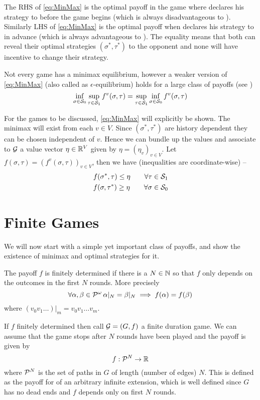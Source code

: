 The RHS of \eqref{eq:MinMax} is the optimal payoff in the game where  declares his strategy to  before the game begins (which is always disadvantageous to ). Similarly LHS of \eqref{eq:MinMax} is the optimal payoff when  declares his strategy to  in advance (which is always advantageous to ). The equality means that both can reveal their optimal strategies $(\sigma^*,\tau^*)$ to the opponent and none will have incentive to change their strategy.

Not every game has a minimax equilibrium, however a weaker version of \eqref{eq:MinMax} (also called as $\epsilon$-equilibrium) holds for a large class of payoffs (see  \cite{roux_equilibria})
\[
    \inf_{\sigma \in \ST{0}} \sup_{\tau \in \ST{1}} f^v(\sigma, \tau) = \sup_{\tau \in \ST{1}} \inf_{\sigma \in \ST{0} } f^v(\sigma,\tau)
\]

For the games to be discussed, \eqref{eq:MinMax} will explicitly be shown. The minimax will exist from each $v \in V$.  Since $(\sigma^*,\tau^*)$ are history dependent they can be chosen independent of $v$. Hence we can bundle up the values and associate to $\G$ a value vector $\eta \in \Reals^V$ given by $\eta = (\eta_v)_{v\in V}$. Let $f(\sigma,\tau) = (f^v(\sigma,\tau))_{v \in V}$, then we have (inequalities are coordinate-wise) --
\begin{equation}
    \begin{aligned}
    f(\sigma^*, \tau) \leq \eta \qquad \forall \tau \in \ST{1}\\
    f(\sigma,\tau^*) \geq \eta \qquad \forall \sigma \in \ST{0}
    \end{aligned}\label{eq:vecMinMax}
\end{equation}

\section{Finite Games}

We will now start with a simple yet important class of payoffs, and show the existence of minimax and optimal strategies for it. 

The payoff $f$ is finitely determined if there is a $N \in \Nat$ so that $f$ only depends on the outcomes in the first $N$ rounds. More precisely 
\[
    \forall \alpha,\beta \in \PI\, \alpha|_N=\beta|_N \implies f(\alpha) = f(\beta) 
\]
where $( v_0 v_1 \ldots )|_m = v_0v_1 \ldots v_m$.

If $f$ finitely determined then call $\G=(G,f)$ a finite duration game. We can assume that the game stops after $N$ rounds have been played and the payoff is given by 
\[
    f : \PF[N] \to \Reals
\]
where $\PF[N]$ is the set of paths in $G$ of length (number of edges) $N$. This is defined as the payoff for of an arbitrary infinite extension, which is well defined since $G$ has no dead ends and $f$ depends only on first $N$ rounds.\\

